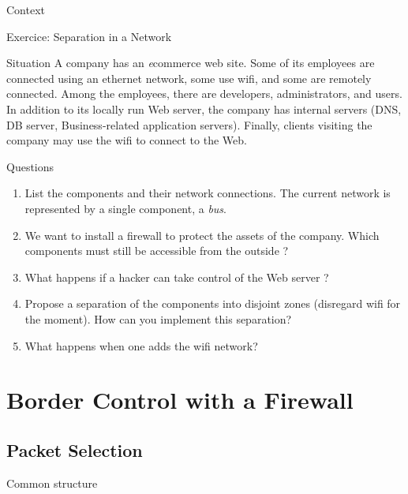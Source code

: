 \begin{reveals}
\begin{frame}[c]{Context}
\end{frame}

\begin{frame}{Exercice: Separation in a Network}

  \begin{block}{Situation}
    A company has an \textit{e}commerce web site. Some of its
    employees are connected using an ethernet network, some use wifi,
    and some are remotely connected. Among the employees, there are
    developers, administrators, and users. In addition to its locally
    run Web server, the company has internal servers (DNS, DB server,
    Business-related application servers). Finally, clients visiting
    the company may use the wifi to connect to the Web.
  \end{block}

  \vfill
  \begin{block}{Questions}
    \begin{enumerate}
    \item List the components and their network connections. The
      current network is represented by a single component, a
      \emph{bus}.
    \item We want to install a firewall to protect the assets of the
      company. Which components must still be accessible from the
      outside ?
    \item What happens if a hacker can take control of the Web server
      ?
    \item Propose a separation of the components into disjoint zones
      (disregard wifi for the moment). How can you implement this
      separation?
    \item What happens when one adds the wifi network?
    \end{enumerate}
  \end{block}

\end{frame}



\section{Border Control with a Firewall}

\subsection{Packet Selection}


\begin{frame}[c]{Common structure}
  

\end{frame}
\end{reveals}
